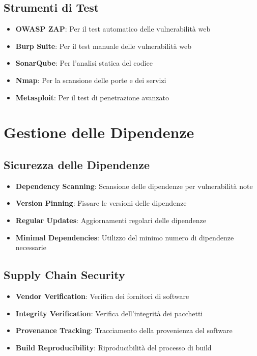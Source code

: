 \subsection{Strumenti di Test}
\begin{itemize}
    \item \textbf{OWASP ZAP}: Per il test automatico delle vulnerabilità web
    \item \textbf{Burp Suite}: Per il test manuale delle vulnerabilità web
    \item \textbf{SonarQube}: Per l'analisi statica del codice
    \item \textbf{Nmap}: Per la scansione delle porte e dei servizi
    \item \textbf{Metasploit}: Per il test di penetrazione avanzato
\end{itemize}

\section{Gestione delle Dipendenze}

\subsection{Sicurezza delle Dipendenze}
\begin{itemize}
    \item \textbf{Dependency Scanning}: Scansione delle dipendenze per vulnerabilità note
    \item \textbf{Version Pinning}: Fissare le versioni delle dipendenze
    \item \textbf{Regular Updates}: Aggiornamenti regolari delle dipendenze
    \item \textbf{Minimal Dependencies}: Utilizzo del minimo numero di dipendenze necessarie
\end{itemize}

\subsection{Supply Chain Security}
\begin{itemize}
    \item \textbf{Vendor Verification}: Verifica dei fornitori di software
    \item \textbf{Integrity Verification}: Verifica dell'integrità dei pacchetti
    \item \textbf{Provenance Tracking}: Tracciamento della provenienza del software
    \item \textbf{Build Reproducibility}: Riproducibilità del processo di build
\end{itemize}

